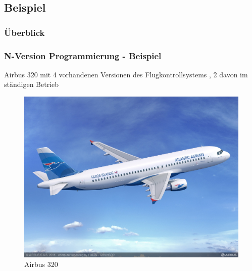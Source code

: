 \subsection{Beispiel}
%
\begin{frame}
	\frametitle{Überblick}
	\tableofcontents[currentsubsection]
\end{frame}
%
\begin{frame}
	\frametitle{N-Version Programmierung - Beispiel}
	Airbus 320 mit 4 vorhandenen Versionen des Flugkontrollsystems , 2 davon im ständigen Betrieb
	\begin{figure}
		\includegraphics[scale=0.13]{grafiken/A320_Atlantic_Airways.jpg}		
		\caption{Airbus 320
			\footnotemark		
		}		
	\end{figure}
\end{frame}